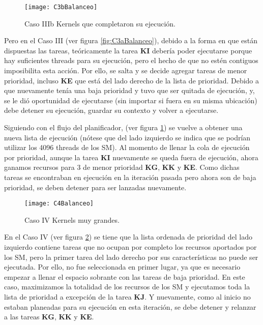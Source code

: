     \begin{figure}[!]
      \centering
        \texttt{[image: C3bBalanceo]}
        \caption{Caso IIIb Kernels que completaron su ejecución.}
        \label{fig:C3bBalanceo}
    \end{figure}
    
    Pero en el Caso III (ver figura \ref{fig:C3aBalanceo}), debido a la forma en que están dispuestas las tareas, teóricamente la tarea \textbf{KI} debería poder ejecutarse porque hay suficientes threads para su ejecución, pero el hecho de que no estén contiguos imposibilita esta acción. 
    Por ello, se salta y se decide agregar tareas de menor prioridad, incluso \textbf{KE} que está del lado derecho de la lista de prioridad. Debido a que nuevamente tenía una baja prioridad y tuvo que ser quitada de ejecución, y, se le dió oportunidad de ejecutarse (sin importar si fuera en su misma ubicación) debe detener su ejecución, guardar su contexto y volver a ejecutarse.
\newline

    Siguiendo con el flujo del planificador, (ver figura \ref{fig:C3bBalanceo}) se vuelve a obtener una nueva lista de ejecución (nótese que del lado izquierdo se indica que se podrían utilizar los 4096 threads de los SM). Al momento de llenar la cola de ejecución por prioridad, aunque la tarea  \textbf{KI} nuevamente se queda fuera de ejecución, ahora ganamos recursos para 3 de menor prioridad \textbf{KG}, \textbf{KK} y \textbf{KE}. Como dichas tareas se encontraban en ejecución en la iteración pasada pero ahora son de baja prioridad, se deben detener para ser lanzadas nuevamente.
\newline

    \begin{figure}[!]
      \centering
        \texttt{[image: C4Balanceo]}
        \caption{Caso IV Kernels muy grandes.}
        \label{fig:C4Balanceo}
    \end{figure}
    
    En el Caso IV (ver figura \ref{fig:C4Balanceo}) se tiene que la lista ordenada de prioridad del lado izquierdo contiene tareas que no ocupan por completo los recursos aportados por los SM, pero la primer tarea del lado derecho por sus características no puede ser ejecutada. 
    Por ello, no fue seleccionada en primer lugar, ya que es necesario empezar a llenar el espacio sobrante con las tareas de baja prioridad. En este caso, maximizamos la totalidad de los recursos de los SM y ejecutamos toda la lista de prioridad a excepción de la tarea \textbf{KJ}. Y nuevamente, como al inicio no estaban planeadas para su ejecución en esta iteración, se debe detener y relanzar a las tareas \textbf{KG}, \textbf{KK} y \textbf{KE}.

